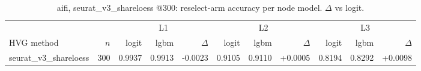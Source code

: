 \begin{table}[t]
\centering
\small
\begin{tabular}{lrrrrrrrrrr}
\toprule
 &  & \multicolumn{3}{c}{L1} & \multicolumn{3}{c}{L2} & \multicolumn{3}{c}{L3} \\
\cmidrule(lr){3-5}\cmidrule(lr){6-8}\cmidrule(lr){9-11}
HVG method & $n$ & logit & lgbm & $\Delta$ & logit & lgbm & $\Delta$ & logit & lgbm & $\Delta$ \\
\midrule
seurat\_v3\_shareloess & 300 & 0.9937 & 0.9913 & -0.0023 & 0.9105 & 0.9110 & +0.0005 & 0.8194 & 0.8292 & +0.0098 \\
\bottomrule
\end{tabular}
\caption{aifi, seurat\_v3\_shareloess @300: reselect-arm accuracy per node model. $\Delta$ vs logit.}
\label{tab:backend-aifi-seurat_v3_shareloess-300}
\end{table}